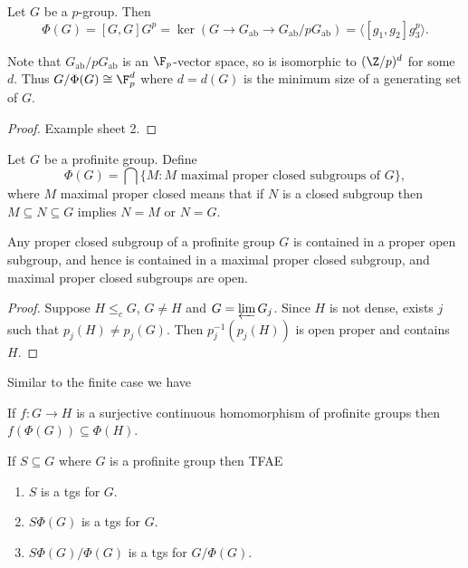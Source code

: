 \documentclass[a4paper]{article}
\begin{document}
\begin{proposition}
  Let \(G\) be a \(p\)-group. Then
  \[
    \Phi(G)
    = [G, G] G^p
    = \ker (G \to G_{\mathrm{ab}} \to G_{\mathrm{ab}}/p G_{\mathrm{ab}})
    = \langle [g_1, g_2] g_3^p \rangle.
  \]
\end{proposition}

Note that \(G_{\mathrm{ab}}/p G_{\mathrm{ab}}\) is an \(\F_p\)-vector space, so is isomorphic to \((\Z/p)^d\) for some \(d\). Thus \(G/\Phi(G) \cong \F_p^d\) where \(d = d(G)\) is the minimum size of a generating set of \(G\).

\begin{proof}
  Example sheet 2.
\end{proof}

\begin{definition}
  Let \(G\) be a profinite group. Define
  \[
    \Phi(G) = \bigcap \{M: M \text{ maximal proper closed subgroups of } G\},
  \]
  where \(M\) maximal proper closed means that if \(N\) is a closed subgroup then \(M \subseteq N \subseteq G\) implies \(N = M\) or \(N = G\).
\end{definition}

\begin{proposition}
  Any proper closed subgroup of a profinite group \(G\) is contained in a proper open subgroup, and hence is contained in a maximal proper closed subgroup, and maximal proper closed subgroups are open.
\end{proposition}

\begin{proof}
  Suppose \(H \leq_c G\), \(G \ne H\) and \(G = \varprojlim G_j\). Since \(H\) is not dense, exists \(j\) such that \(p_j(H) \ne p_j(G)\). Then \(p_j^{-1}(p_j(H))\) is open proper and contains \(H\).
\end{proof}

Similar to the finite case we have

\begin{lemma}
  If \(f: G \to H\) is a surjective continuous homomorphism of profinite groups then \(f(\Phi(G)) \subseteq \Phi(H)\).
\end{lemma}

\begin{proposition}
  If \(S \subseteq G\) where \(G\) is a profinite group then TFAE
  \begin{enumerate}
  \item \(S\) is a tgs for \(G\).
  \item \(S \Phi(G)\) is a tgs for \(G\).
  \item \(S \Phi(G)/\Phi(G)\) is a tgs for \(G/\Phi(G)\).
  \end{enumerate}
\end{proposition}
\end{document}
